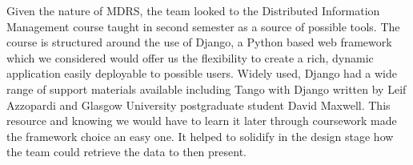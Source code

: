 \documentclass{l3proj}
\begin{document}


Given the nature of MDRS, the team looked to the Distributed Information Management course taught in second semester as a source of possible tools. The course is structured around the use of Django, a Python based web framework which we considered  would offer us the flexibility to create a rich, dynamic application easily deployable to possible users. Widely used, Django had a wide range of support materials available including Tango with Django written by Leif Azzopardi and Glasgow University postgraduate student David Maxwell. This resource and knowing we would have to learn it later through coursework made the framework choice an easy one. It helped to solidify in the design stage how the team could retrieve the data to then present.
\end{document}
